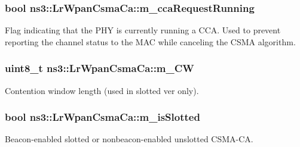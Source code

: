 \subsubsection[{\texorpdfstring{m\+\_\+cca\+Request\+Running}{m_ccaRequestRunning}}]{\setlength{\rightskip}{0pt plus 5cm}bool ns3\+::\+Lr\+Wpan\+Csma\+Ca\+::m\+\_\+cca\+Request\+Running\hspace{0.3cm}{\ttfamily [private]}}\hypertarget{classns3_1_1LrWpanCsmaCa_ac340966d433ad1f4e8e47a4fea322b4e}{}\label{classns3_1_1LrWpanCsmaCa_ac340966d433ad1f4e8e47a4fea322b4e}
Flag indicating that the P\+HY is currently running a C\+CA. Used to prevent reporting the channel status to the M\+AC while canceling the C\+S\+MA algorithm. 
\subsubsection[{\texorpdfstring{m\+\_\+\+CW}{m_CW}}]{\setlength{\rightskip}{0pt plus 5cm}uint8\+\_\+t ns3\+::\+Lr\+Wpan\+Csma\+Ca\+::m\+\_\+\+CW\hspace{0.3cm}{\ttfamily [private]}}\hypertarget{classns3_1_1LrWpanCsmaCa_a8d023ec83ebdeafe0a89602b8185e357}{}\label{classns3_1_1LrWpanCsmaCa_a8d023ec83ebdeafe0a89602b8185e357}
Contention window length (used in slotted ver only). 
\subsubsection[{\texorpdfstring{m\+\_\+is\+Slotted}{m_isSlotted}}]{\setlength{\rightskip}{0pt plus 5cm}bool ns3\+::\+Lr\+Wpan\+Csma\+Ca\+::m\+\_\+is\+Slotted\hspace{0.3cm}{\ttfamily [private]}}\hypertarget{classns3_1_1LrWpanCsmaCa_a2a0bc6d2b32686d4f5aaf10c37813340}{}\label{classns3_1_1LrWpanCsmaCa_a2a0bc6d2b32686d4f5aaf10c37813340}
Beacon-\/enabled slotted or nonbeacon-\/enabled unslotted C\+S\+M\+A-\/\+CA. 
